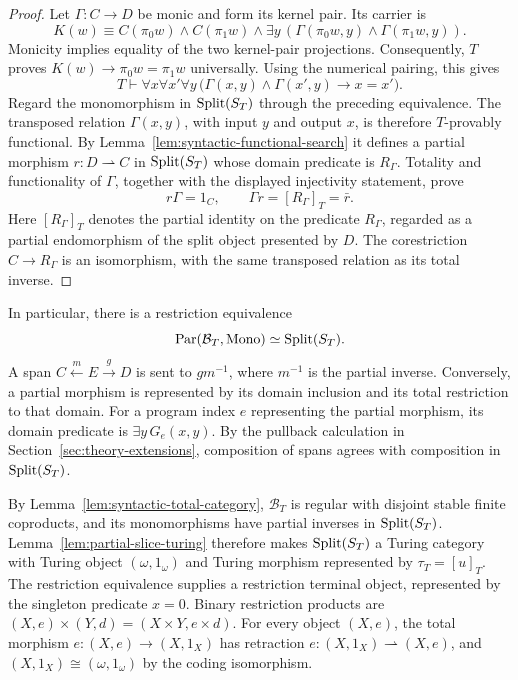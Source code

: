 \begin{proof}
Let $\Gamma:C\to D$ be monic and form its kernel pair. Its carrier is
\[
 K(w)\equiv C(\pi_0w)\land C(\pi_1w)\land
    \exists y\,(\Gamma(\pi_0w,y)\land\Gamma(\pi_1w,y)).
\]
Monicity implies equality of the two kernel-pair projections.
Consequently, $T$ proves $K(w)\to\pi_0w=\pi_1w$ universally.
Using the numerical pairing, this gives
\[
 T\vdash\forall x\forall x'\forall y\,
  \bigl(\Gamma(x,y)\land\Gamma(x',y)\longrightarrow x=x'\bigr).
\]
Regard the monomorphism in $\operatorname{Split}(S_T)$ through the preceding
equivalence. The transposed relation $\Gamma(x,y)$, with input $y$ and
output $x$, is therefore $T$-provably functional. By
Lemma~\ref{lem:syntactic-functional-search} it defines a partial
morphism $r:D\rightharpoonup C$ in $\operatorname{Split}(S_T)$ whose domain
predicate is $R_\Gamma$. Totality and functionality of $\Gamma$,
together with the displayed injectivity statement, prove
\[
 r\Gamma=1_C,\qquad
 \Gamma r=[R_\Gamma]_T=\bar r.
\]
Here $[R_\Gamma]_T$ denotes the partial identity on the predicate
$R_\Gamma$, regarded as a partial endomorphism of the split object
presented by $D$. The corestriction $C\to R_\Gamma$ is an isomorphism,
with the same transposed relation as its total inverse.
\end{proof}

In particular, there is a restriction equivalence
\[
 \operatorname{Par}(\mathcal B_T,\operatorname{Mono})\simeq\operatorname{Split}(S_T).
\]
A span $C\xleftarrow{m}E\xrightarrow{g}D$ is sent
to $gm^{-1}$, where $m^{-1}$ is the partial inverse.
Conversely, a partial morphism is represented by its domain
inclusion and its total restriction to that domain. For a program index $e$ representing the partial morphism, its domain
predicate is $\exists y\,G_e(x,y)$. By the pullback calculation in Section~\ref{sec:theory-extensions},
composition of spans agrees with composition in $\operatorname{Split}(S_T)$.

By Lemma~\ref{lem:syntactic-total-category}, $\mathcal B_T$ is regular
with disjoint stable finite coproducts, and its monomorphisms have
partial inverses in $\operatorname{Split}(S_T)$. Lemma~\ref{lem:partial-slice-turing}
therefore makes $\operatorname{Split}(S_T)$ a Turing category with Turing object
$(\omega,1_\omega)$ and Turing morphism represented by $\tau_T=[u]_T$.
The restriction equivalence supplies a restriction
terminal object, represented by the singleton predicate $x=0$.
Binary restriction products are
$(X,e)\times(Y,d)=(X\times Y,e\times d)$.
For every object $(X,e)$, the total morphism
$e:(X,e)\to(X,1_X)$ has retraction
$e:(X,1_X)\rightharpoonup(X,e)$, and $(X,1_X)\cong(\omega,1_\omega)$
by the coding isomorphism.

